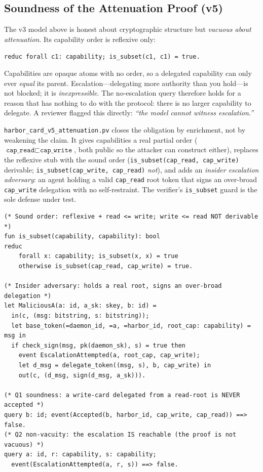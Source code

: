 \documentclass[11pt,a4paper]{article}
\theoremstyle{definition}
\begin{document}
\subsection{Soundness of the Attenuation Proof (v5)}\label{sec:attn-soundness}

The v3 model above is honest about cryptographic structure but \emph{vacuous about
attenuation}. Its capability order is reflexive only:
\begin{center}\texttt{reduc forall c1: capability; is\_subset(c1, c1) = true.}\end{center}
Capabilities are opaque atoms with no order, so a delegated capability can only
ever \emph{equal} its parent. Escalation---delegating more authority than you
hold---is not blocked; it is \emph{inexpressible}. The no-escalation query
therefore holds for a reason that has nothing to do with the protocol: there is
no larger capability to delegate. A reviewer flagged this directly: \emph{``the
model cannot witness escalation.''}

\texttt{harbor\_card\_v5\_attenuation.pv} closes the obligation by enrichment,
not by weakening the claim. It gives capabilities a real partial order
($\texttt{cap\_read} \sqsubset \texttt{cap\_write}$, both public so the
attacker can construct either), replaces the reflexive stub with the sound order
(\texttt{is\_subset(cap\_read, cap\_write)} derivable; \texttt{is\_subset(cap\_write,
cap\_read)} \emph{not}), and adds an \emph{insider escalation adversary}: an agent
holding a valid \texttt{cap\_read} root token that signs an over-broad
\texttt{cap\_write} delegation with no self-restraint. The verifier's
\texttt{is\_subset} guard is the sole defense under test.

\begin{lstlisting}[caption={\texttt{harbor\_card\_v5\_attenuation.pv} (excerpt) --- Verified in ProVerif 2.05}]
(* Sound order: reflexive + read <= write; write <= read NOT derivable *)
fun is_subset(capability, capability): bool
reduc
    forall x: capability; is_subset(x, x) = true
    otherwise is_subset(cap_read, cap_write) = true.

(* Insider adversary: holds a real root, signs an over-broad delegation *)
let MaliciousA(a: id, a_sk: skey, b: id) =
  in(c, (msg: bitstring, s: bitstring));
  let base_token(=daemon_id, =a, =harbor_id, root_cap: capability) = msg in
  if check_sign(msg, pk(daemon_sk), s) = true then
    event EscalationAttempted(a, root_cap, cap_write);
    let d_msg = delegate_token((msg, s), b, cap_write) in
    out(c, (d_msg, sign(d_msg, a_sk))).

(* Q1 soundness: a write-card delegated from a read-root is NEVER accepted *)
query b: id; event(Accepted(b, harbor_id, cap_write, cap_read)) ==> false.
(* Q2 non-vacuity: the escalation IS reachable (the proof is not vacuous) *)
query a: id, r: capability, s: capability;
  event(EscalationAttempted(a, r, s)) ==> false.
\end{lstlisting}
\end{document}

